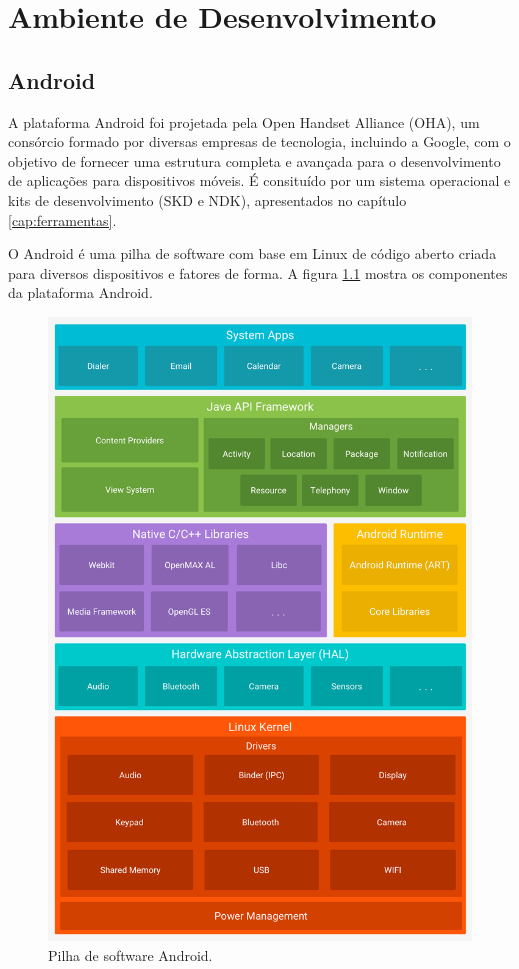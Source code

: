 \chapter{Ambiente de Desenvolvimento}\label{cap:ambdes}

\section{Android}\label{sec:android}
A plataforma Android foi projetada pela Open Handset Alliance (OHA), um consórcio formado por diversas empresas de tecnologia, incluindo a Google, com o objetivo de fornecer uma estrutura completa e avançada para o desenvolvimento de aplicações para dispositivos móveis. É consituído por um sistema operacional e kits de desenvolvimento (SKD e NDK), apresentados no capítulo \ref{cap:ferramentas}.

O Android é uma pilha de software com base em Linux de código aberto criada para diversos dispositivos e fatores de forma. A figura \ref{fig:android_stack} mostra os componentes da plataforma Android. \cite{arquiteturaplataforma}

	\begin{figure}[!htb]
       \begin{center}  
          \includegraphics[width=0.5\columnwidth]{img/android_stack.jpg}
           \caption{\label{fig:android_stack}Pilha de software Android.}
       \end{center}
   \end{figure}



